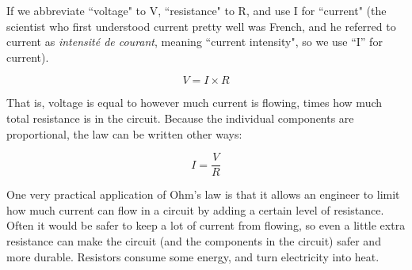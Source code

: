 If we abbreviate ``voltage" to V, ``resistance" to R, and use I for ``current" (the scientist who first understood current pretty well was French, and he referred to current as \emph{intensit{\'e} de courant}, meaning ``current intensity", so we use ``I'' for current). 

\begin{equation}
V = I \times R
\end{equation}


That is, voltage is equal to however much current is flowing, times how much total resistance is in the circuit. Because the individual components are proportional, the law can be written other ways:

\begin{equation}
I =  \frac{V}{R}
\end{equation}

One very practical application of Ohm's law is that it allows an engineer to limit how much current can flow in a circuit by adding a certain level of resistance. Often it would be safer to keep a lot of current from flowing, so even a little extra resistance can make the circuit (and the components in the circuit) safer and more durable. Resistors consume some energy, and turn electricity into heat.



